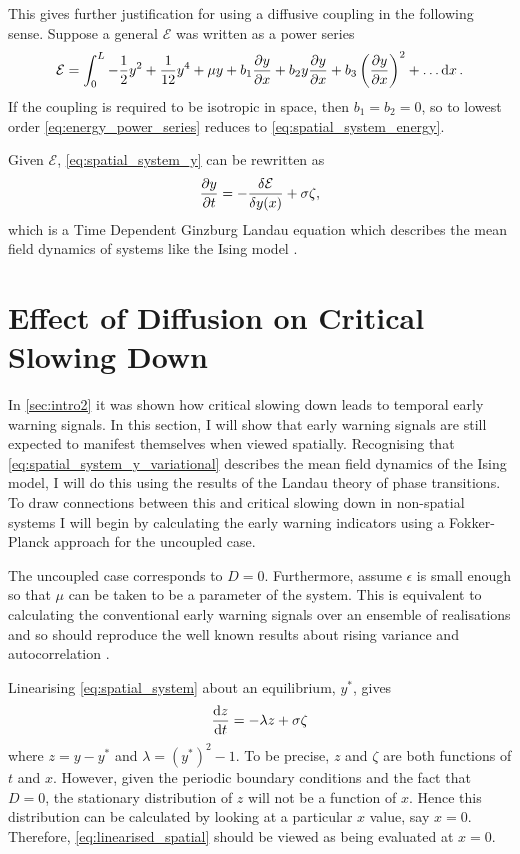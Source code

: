 This gives further justification for using a diffusive coupling in the following sense. Suppose a general $\mathcal{E}$ was written as a power series
\begin{equation}
  \label{eq:energy_power_series}
  \mathcal{E} = \int_0^L  -\frac{1}{2}y^2 + \frac{1}{12}y^4 + \mu y + b_1 \pdv{y}{x} + b_2 y \pdv{y}{x} + b_3 \left(\pdv{y}{x}\right)^2 + \ldots \dd{x}.
\end{equation}
If the coupling is required to be isotropic in space, then $b_1 = b_2 = 0$, so to lowest order \cref{eq:energy_power_series} reduces to
\cref{eq:spatial_system_energy}.

Given $\mathcal{E}$, \cref{eq:spatial_system_y} can be rewritten as
\begin{equation}
  \label{eq:spatial_system_y_variational}
    \pdv{y}{t} = -\fdv{\mathcal{E}}{y(x)}  + \sigma\zeta, 
\end{equation}
which is a Time Dependent Ginzburg Landau equation which describes the mean field dynamics of systems like the Ising model \parencite{Goldenfeld1992}.

\section{Effect of Diffusion on Critical Slowing Down}
\label{sec:spatial_csd}
In \cref{sec:intro2} it was shown how critical slowing down leads to temporal early warning signals. In this section, I will show that early warning signals are still expected
to manifest themselves when viewed spatially. Recognising that \cref{eq:spatial_system_y_variational} describes the mean field dynamics of
the Ising model, I will do this using the results of the Landau theory of phase transitions. To draw connections between this and critical slowing down in non-spatial systems
I will begin by calculating the early warning indicators using a Fokker-Planck approach for the uncoupled case.

The uncoupled case corresponds to  $D = 0$. Furthermore, assume $\epsilon$ is small enough so that $\mu$ can be taken to be a parameter of the system.
This is equivalent to calculating the conventional early warning signals over an ensemble of realisations and so should reproduce the well known results about rising variance
and autocorrelation \parencite{Dakos2008}.

Linearising \cref{eq:spatial_system} about an equilibrium, $y^*$, gives
\begin{equation}
  \label{eq:linearised_spatial}
  \dv{z}{t} = -\lambda z + \sigma \zeta
\end{equation}
where $z = y - y^*$ and $\lambda = (y^*)^2 - 1$. To be precise, $z$ and $\zeta$ are both functions of $t$ and $x$. However, given the periodic boundary conditions and the
fact that $D = 0$, the stationary distribution of $z$ will not be a function of $x$. Hence this distribution can be calculated by looking at a particular $x$ value, say $x = 0$.
Therefore, \cref{eq:linearised_spatial} should be viewed as being evaluated at $x = 0$.

